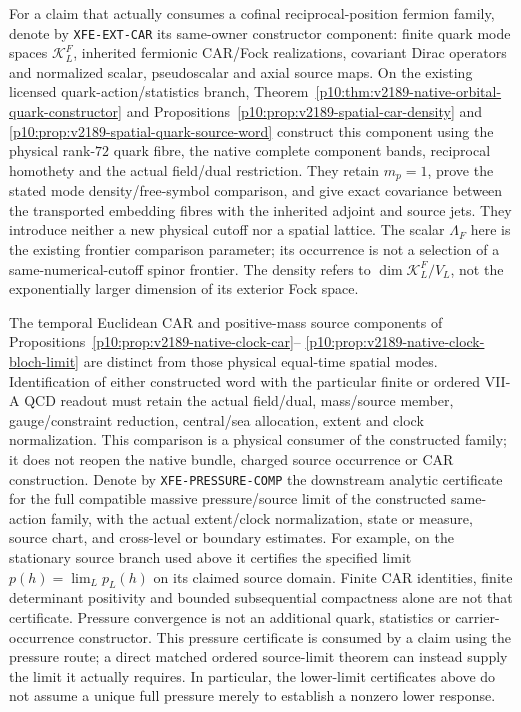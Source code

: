 \documentclass[12pt,a4paper]{article}
\begin{document}
\begin{definition}
\label{p10:def:v2186-xfe-constructor-pressure-split}
For a claim that actually consumes a cofinal reciprocal-position fermion
family, denote by \texttt{XFE-EXT-CAR} its same-owner constructor component:
finite quark mode spaces $\mathcal K_L^F$, inherited fermionic CAR/Fock
realizations, covariant Dirac operators and normalized scalar, pseudoscalar
and axial source maps. On the existing licensed quark-action/statistics
branch, Theorem~\ref{p10:thm:v2189-native-orbital-quark-constructor} and
Propositions~\ref{p10:prop:v2189-spatial-car-density} and
\ref{p10:prop:v2189-spatial-quark-source-word} construct this component
using the physical rank-$72$ quark fibre, the native complete component
bands, reciprocal homothety and the actual field/dual restriction.
They retain $m_p=1$, prove the stated mode density/free-symbol comparison,
and give exact covariance between the transported embedding fibres with
the inherited adjoint and source jets. They introduce neither a new
physical cutoff nor a spatial lattice. The scalar $\Lambda_F$ here is the
existing frontier comparison parameter; its occurrence is not a selection
of a same-numerical-cutoff spinor frontier.
The density refers to $\dim\mathcal K_L^F/V_L$, not the exponentially
larger dimension of its exterior Fock space.

The temporal Euclidean CAR and positive-mass source components of
Propositions~\ref{p10:prop:v2189-native-clock-car}--
\ref{p10:prop:v2189-native-clock-bloch-limit} are distinct from those
physical equal-time spatial modes. Identification of either constructed
word with the particular finite or ordered VII-A QCD readout must retain
the actual field/dual, mass/source member, gauge/constraint reduction,
central/sea allocation, extent and clock normalization. This comparison
is a physical consumer of the constructed family; it does not reopen the
native bundle, charged source occurrence or CAR construction.
Denote by \texttt{XFE-PRESSURE-COMP} the downstream analytic certificate
for the full compatible massive pressure/source limit of the constructed
same-action family, with the actual extent/clock normalization, state or
measure, source chart, and cross-level or boundary estimates.  For example,
on the stationary source branch used above it certifies the specified limit
$p(h)=\lim_L p_L(h)$ on its claimed source domain.  Finite CAR identities,
finite determinant positivity and bounded subsequential compactness alone
are not that certificate.  Pressure convergence is not an additional quark,
statistics or carrier-occurrence constructor.  This pressure certificate is
consumed by a claim using the pressure route; a direct matched ordered
source-limit theorem can instead supply the limit it actually requires.
In particular, the lower-limit certificates above do not assume a unique full
pressure merely to establish a nonzero lower response.
\end{definition}
\end{document}

